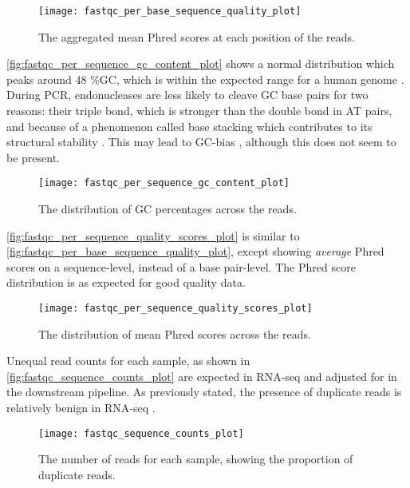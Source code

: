 \begin{figure}[!h]
    \centering
    \texttt{[image: fastqc\_per\_base\_sequence\_quality\_plot]}
    \caption{The aggregated mean Phred scores at each position of the reads.} %
    \label{fig:fastqc_per_base_sequence_quality_plot}
\end{figure}

\newpage
\autoref{fig:fastqc_per_sequence_gc_content_plot} shows a normal distribution which peaks around 48 \%GC, which is within the expected range for a human genome \citep{meunier2004recombination}. During PCR, endonucleases are less likely to cleave GC base pairs for two reasons: their triple bond, which is stronger than the double bond in AT pairs, and because of  a phenomenon called base stacking which contributes to its structural stability \citep{yakovchuk2006base}. This may lead to GC-bias \citep{benjamini2012summarizing}, although this does not seem to be present.

\begin{figure}[!h]
    \centering
    \texttt{[image: fastqc\_per\_sequence\_gc\_content\_plot]}
    \caption{The distribution of GC percentages across the reads.}
    \label{fig:fastqc_per_sequence_gc_content_plot}
\end{figure}

\newpage
\autoref{fig:fastqc_per_sequence_quality_scores_plot} is similar to  \autoref{fig:fastqc_per_base_sequence_quality_plot}, except showing \textit{average} Phred scores on a sequence-level, instead of a base pair-level. The Phred score distribution is as expected for good quality data.


\begin{figure}[!h]
    \centering
    \texttt{[image: fastqc\_per\_sequence\_quality\_scores\_plot]}
    \caption{The distribution of mean Phred scores across the reads.} %
    \label{fig:fastqc_per_sequence_quality_scores_plot}
\end{figure}

\newpage
Unequal read counts for each sample, as shown in \autoref{fig:fastqc_sequence_counts_plot} are expected in RNA-seq and adjusted for in the downstream pipeline. As previously stated, the presence of duplicate reads is relatively benign in RNA-seq \citep{parekh2016impact}.

\begin{figure}[!h]
    \centering
    \texttt{[image: fastqc\_sequence\_counts\_plot]}
    \caption{The number of reads for each sample, showing the proportion of duplicate reads.}
    \label{fig:fastqc_sequence_counts_plot}
\end{figure}
\newpage


